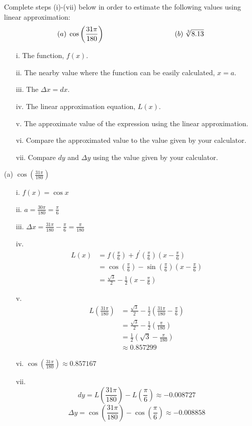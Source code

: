 \documentclass[nooutcomes]{ximera}
\begin{document}
\begin{problem}
Complete steps (i)-(vii) below in order to estimate the following values using linear approximation:
$$ (a) \; \cos \left( \frac{31 \pi}{180} \right)	\hskip 100pt	(b) \; \sqrt[3]{8.13} $$
	\begin{enumerate}
	\item[i.]  The function, $f(x)$.
	\item[ii.]  The nearby value where the function can be easily calculated, $x=a$.
	\item[iii.]  The $\Delta x=dx$.
	\item[iv.]  The linear approximation equation, $L(x)$.  
	\item[v.]  The approximate value of the expression using the linear approximation.
	\item[vi.]  Compare the approximated value to the value given by your calculator.
	\item[vii.]  Compare $dy$ and $\Delta y$ using the value given by your calculator.
	\end{enumerate}
		\begin{freeResponse}
		(a)  $ \cos \left( \frac{31 \pi}{180} \right)$
			\begin{enumerate}
			\item[i.]  $f(x) = \cos x$
			\item[ii.]  $a = \frac{30 \pi}{180} = \frac{\pi}{6}$
			\item[iii.]  $\Delta x = \frac{31 \pi}{180} - \frac{\pi}{6} = \frac{\pi}{180}$
			\item[iv.]  
				\begin{align*}
				L(x) &= f\left( \frac{\pi}{6} \right) + f^\prime \left(\frac{\pi}{6} \right) \left( x - \frac{\pi}{6} \right) \\
				&=  \cos \left( \frac{\pi}{6} \right) - \sin \left(\frac{\pi}{6} \right) \left( x - \frac{\pi}{6} \right) \\
				&=  \frac{\sqrt{3}}{2} - \frac{1}{2} \left( x - \frac{\pi}{6} \right) 
				\end{align*}
			\item[v.]   
				\begin{align*}
				L \left( \frac{31 \pi}{180} \right) &= \frac{\sqrt{3}}{2} - \frac{1}{2} \left( \frac{31 \pi}{180} - \frac{\pi}{6} \right) \\
				&=  \frac{\sqrt{3}}{2} - \frac{1}{2} \left( \frac{\pi}{180} \right) \\
				&= \frac{1}{2} \left( \sqrt{3} - \frac{\pi}{180} \right) \\
				&\approx 0.857299
				\end{align*}
			\item[vi.]  $\cos \left( \frac{31 \pi}{180} \right) \approx 0.857167$
			\item[vii.]  
			$$ dy = L\left( \frac{31\pi}{180} \right) - L \left( \frac{\pi}{6} \right) \approx -0.008727 $$
			$$ \Delta y = \cos \left( \frac{31 \pi}{180} \right) - \cos \left( \frac{\pi}{6} \right) \approx -0.008858 $$
			\end{enumerate}
			

\end{freeResponse}
\end{problem}
\end{document}
